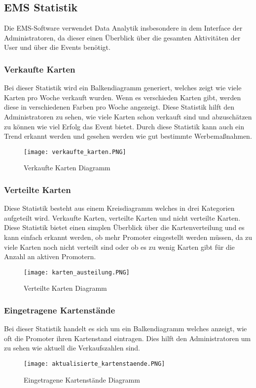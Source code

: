 \subsection{EMS Statistik}
Die EMS-Software verwendet Data Analytik insbesondere in dem Interface der Administratoren, da dieser einen Überblick über die gesamten Aktivitäten der User und über die Events benötigt.  			
\subsubsection{Verkaufte Karten}
Bei dieser Statistik wird ein Balkendiagramm generiert, welches zeigt wie viele Karten pro Woche verkauft wurden. Wenn es verschieden Karten gibt, werden diese in verschiedenen Farben pro Woche angezeigt. 
Diese Statistik hilft den Administratoren zu sehen, wie viele Karten schon verkauft sind und abzuschätzen zu können wie viel Erfolg das Event bietet. Durch diese Statistik kann auch ein Trend erkannt werden und gesehen werden wie gut bestimmte Werbemaßnahmen.	
\begin{figure}[H]
	\centering
	\texttt{[image: verkaufte\_karten.PNG]}
	\caption{Verkaufte Karten Diagramm}
\end{figure}
\subsubsection{Verteilte Karten}
Diese Statistik besteht aus einem Kreisdiagramm welches in drei Kategorien aufgeteilt wird. Verkaufte Karten, verteilte Karten und nicht verteilte Karten. 
Diese Statistik bietet einen simplen Überblick über die Kartenverteilung und es kann einfach erkannt werden, ob mehr Promoter eingestellt werden müssen, da zu viele Karten noch nicht verteilt sind oder ob es zu wenig Karten gibt für die Anzahl an aktiven Promotern. 	
\begin{figure}[H]
	\centering
	\texttt{[image: karten\_austeilung.PNG]}
	\caption{Verteilte Karten Diagramm}
	\end{figure}
\subsubsection{Eingetragene Kartenstände}
Bei dieser Statistik handelt es sich um ein Balkendiagramm welches anzeigt, wie oft die Promoter ihren Kartenstand eintragen. Dies hilft den Administratoren um zu sehen wie aktuell die Verkaufszahlen sind.
\begin{figure}[H]
	\centering
	\texttt{[image: aktualisierte\_kartenstaende.PNG]}
	\caption{Eingetragene Kartenstände Diagramm}
\end{figure}

